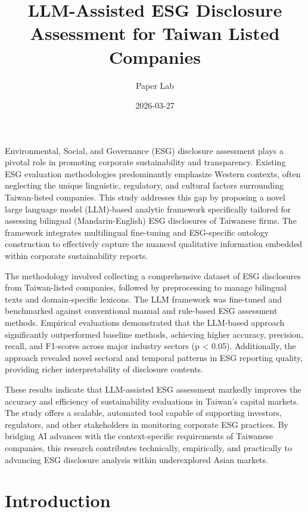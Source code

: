 \documentclass[
  12pt,
]{article}
\title{LLM-Assisted ESG Disclosure Assessment for Taiwan Listed
Companies}
\author{Paper Lab}
\date{2026-03-27}
\begin{document}
\maketitle


Environmental, Social, and Governance (ESG) disclosure assessment plays
a pivotal role in promoting corporate sustainability and transparency.
Existing ESG evaluation methodologies predominantly emphasize Western
contexts, often neglecting the unique linguistic, regulatory, and
cultural factors surrounding Taiwan-listed companies. This study
addresses this gap by proposing a novel large language model (LLM)-based
analytic framework specifically tailored for assessing bilingual
(Mandarin-English) ESG disclosures of Taiwanese firms. The framework
integrates multilingual fine-tuning and ESG-specific ontology
construction to effectively capture the nuanced qualitative information
embedded within corporate sustainability reports.

The methodology involved collecting a comprehensive dataset of ESG
disclosures from Taiwan-listed companies, followed by preprocessing to
manage bilingual texts and domain-specific lexicons. The LLM framework
was fine-tuned and benchmarked against conventional manual and
rule-based ESG assessment methods. Empirical evaluations demonstrated
that the LLM-based approach significantly outperformed baseline methods,
achieving higher accuracy, precision, recall, and F1-scores across major
industry sectors (p \textless{} 0.05). Additionally, the approach
revealed novel sectoral and temporal patterns in ESG reporting quality,
providing richer interpretability of disclosure contents.

These results indicate that LLM-assisted ESG assessment markedly
improves the accuracy and efficiency of sustainability evaluations in
Taiwan's capital markets. The study offers a scalable, automated tool
capable of supporting investors, regulators, and other stakeholders in
monitoring corporate ESG practices. By bridging AI advances with the
context-specific requirements of Taiwanese companies, this research
contributes technically, empirically, and practically to advancing ESG
disclosure analysis within underexplored Asian markets.

\section{Introduction}\label{introduction}
\end{document}
